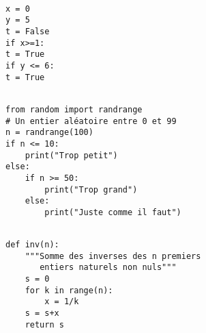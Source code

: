 \exer{}
\setcounter{numques}{0}

\begin{lstlisting}

x = 0
y = 5
t = False
if x>=1:
t = True
if y <= 6:
t = True
\end{lstlisting}


\begin{lstlisting}

from random import randrange
# Un entier aléatoire entre 0 et 99
n = randrange(100) 
if n <= 10:
    print("Trop petit")
else:
    if n >= 50:
        print("Trop grand")
    else:
        print("Juste comme il faut")
\end{lstlisting}




\begin{lstlisting}

def inv(n):
    """Somme des inverses des n premiers 
       entiers naturels non nuls"""
    s = 0
    for k in range(n):
        x = 1/k
    s = s+x
    return s
\end{lstlisting}
